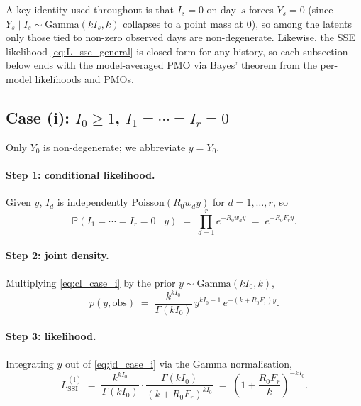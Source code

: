 \documentclass{article}
\theoremstyle{definition}
\begin{document}
A key identity used throughout is that $I_s = 0$ on day~$s$ forces
$Y_s = 0$ (since $Y_s \mid I_s \sim \mathrm{Gamma}(k I_s, k)$ collapses
to a point mass at $0$), so among the latents only those tied to
non-zero observed days are non-degenerate.  Likewise, the SSE
likelihood \eqref{eq:L_sse_general} is closed-form for any history,
so each subsection below ends with the model-averaged PMO via Bayes'
theorem from the per-model likelihoods and PMOs.

\subsection{Case (i): \(I_0 \geq 1\), \(I_1 = \cdots = I_r = 0\)}
\label{sec:ssi_case_i}

Only $Y_0$ is non-degenerate; we abbreviate $y = Y_0$.

\paragraph{Step 1: conditional likelihood.}
Given $y$, $I_d$ is independently $\mathrm{Poisson}(R_0 w_d y)$ for
$d = 1, \ldots, r$, so
\begin{equation}\label{eq:cl_case_i}
  \mathbb{P}(I_1 = \cdots = I_r = 0 \mid y)
  \;=\; \prod_{d=1}^r e^{-R_0 w_d y}
  \;=\; e^{-R_0 F_r y}.
\end{equation}

\paragraph{Step 2: joint density.}
Multiplying \eqref{eq:cl_case_i} by the prior
$y \sim \mathrm{Gamma}(k I_0, k)$,
\begin{equation}\label{eq:jd_case_i}
  p(y, \mathrm{obs})
  \;=\; \frac{k^{k I_0}}{\Gamma(k I_0)}\,
  y^{k I_0 - 1}\, e^{-(k + R_0 F_r) y}.
\end{equation}

\paragraph{Step 3: likelihood.}
Integrating $y$ out of \eqref{eq:jd_case_i} via the Gamma normalisation,
\begin{equation}\label{eq:L_ssi_case_i}
  L_\mathrm{SSI}^{(\mathrm{i})}
  \;=\; \frac{k^{k I_0}}{\Gamma(k I_0)}\cdot
  \frac{\Gamma(k I_0)}{(k + R_0 F_r)^{k I_0}}
  \;=\; \left(1 + \frac{R_0 F_r}{k}\right)^{-k I_0}.
\end{equation}
\end{document}
